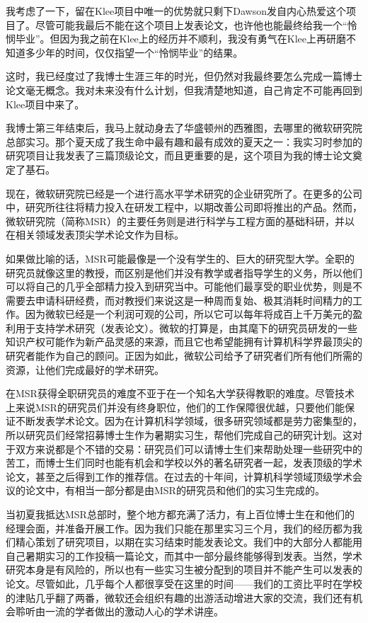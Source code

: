 \documentclass[letter,12pt]{book}
\begin{document}
\begin{CJK}{UTF8}{gbsn}
我考虑了一下，留在Klee项目中唯一的优势就只剩下Dawson发自内心热爱这个项目了。尽管可能我最后不能在这个项目上发表论文，也许他也能最终给我一个“怜悯毕业”。但因为我之前在Klee上的经历并不顺利，我没有勇气在Klee上再研磨不知道多少年的时间，仅仅指望一个“怜悯毕业”的结果。

这时，我已经度过了我博士生涯三年的时光，但仍然对我最终要怎么完成一篇博士论文毫无概念。我对未来没有什么计划，但我清楚地知道，自己肯定不可能再回到Klee项目中来了。


我博士第三年结束后，我马上就动身去了华盛顿州的西雅图，去哪里的微软研究院总部实习。那个夏天成了我生命中最有趣和最有成效的夏天之一：我实习时参加的研究项目让我发表了三篇顶级论文，而且更重要的是，这个项目为我的博士论文奠定了基石。

现在，微软研究院已经是一个进行高水平学术研究的企业研究所了。在更多的公司中，研究所往往将精力投入在研发工程中，以期改善公司即将推出的产品。然而，微软研究院（简称MSR）的主要任务则是进行科学与工程方面的基础科研，并以在相关领域发表顶尖学术论文作为目标。

如果做比喻的话，MSR可能最像是一个没有学生的、巨大的研究型大学。全职的研究员就像这里的教授，而区别是他们并没有教学或者指导学生的义务，所以他们可以将自己的几乎全部精力投入到研究当中。可能他们最享受的职业优势，则是不需要去申请科研经费，而对教授们来说这是一种周而复始、极其消耗时间精力的工作。因为微软已经是一个利润可观的公司，所以它可以每年将成百上千万美元的盈利用于支持学术研究（发表论文）。微软的打算是，由其麾下的研究员研发的一些知识产权可能作为新产品灵感的来源，而且它也希望能拥有计算机科学界最顶尖的研究者能作为自己的顾问。正因为如此，微软公司给予了研究者们所有他们所需的资源，让他们完成最好的学术研究。

在MSR获得全职研究员的难度不亚于在一个知名大学获得教职的难度。尽管技术上来说MSR的研究员们并没有终身职位，他们的工作保障很优越，只要他们能保证不断发表学术论文。因为在计算机科学领域，很多研究领域都是劳力密集型的，所以研究员们经常招募博士生作为暑期实习生，帮他们完成自己的研究计划。这对于双方来说都是个不错的交易：研究员们可以请博士生们来帮助处理一些研究中的苦工，而博士生们同时也能有机会和学校以外的著名研究者一起，发表顶级的学术论文，甚至之后得到工作的推荐信。在过去的十年间，计算机科学领域顶级学术会议的论文中，有相当一部分都是由MSR的研究员和他们的实习生完成的。

当初夏我抵达MSR总部时，整个地方都充满了活力，有上百位博士生在和他们的经理会面，并准备开展工作。因为我们只能在那里实习三个月，我们的经历都为我们精心策划了研究项目，以期在实习结束时能发表论文。我们中的大部分人都能用自己暑期实习的工作投稿一篇论文，而其中一部分最终能够得到发表。当然，学术研究本身是有风险的，所以也有一些实习生被分配到的项目并不能产生可以发表的论文。尽管如此，几乎每个人都很享受在这里的时间——我们的工资比平时在学校的津贴几乎翻了两番，微软还会组织有趣的出游活动增进大家的交流，我们还有机会聆听由一流的学者做出的激动人心的学术讲座。


\end{CJK}
\end{document}
